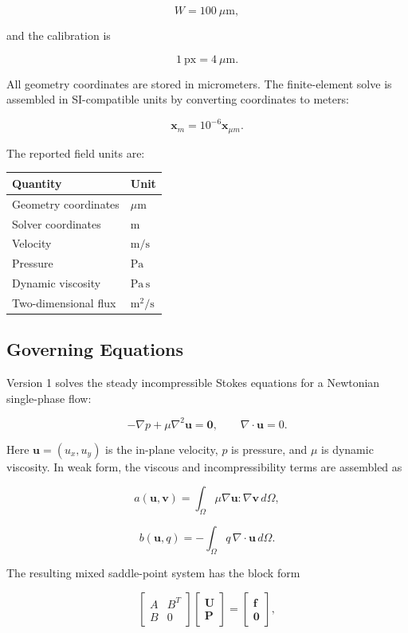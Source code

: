 \[
  W = 100~\mu\mathrm{m},
\]

and the calibration is

\[
  1~\mathrm{px} = 4~\mu\mathrm{m}.
\]

All geometry coordinates are stored in micrometers. The finite-element solve is
assembled in SI-compatible units by converting coordinates to meters:

\[
  \mathbf{x}_{m} = 10^{-6}\mathbf{x}_{\mu m}.
\]

The reported field units are:

\begin{center}
\begin{tabular}{@{}ll@{}}
\toprule
Quantity & Unit \\
\midrule
Geometry coordinates & \(\mu\mathrm{m}\) \\
Solver coordinates & \(\mathrm{m}\) \\
Velocity & \(\mathrm{m/s}\) \\
Pressure & \(\mathrm{Pa}\) \\
Dynamic viscosity & \(\mathrm{Pa\,s}\) \\
Two-dimensional flux & \(\mathrm{m^2/s}\) \\
\bottomrule
\end{tabular}
\end{center}

\subsection{Governing Equations}

Version 1 solves the steady incompressible Stokes equations for a Newtonian
single-phase flow:

\[
  -\nabla p + \mu \nabla^2 \mathbf{u} = \mathbf{0},
  \qquad
  \nabla \cdot \mathbf{u} = 0.
\]

Here \(\mathbf{u} = (u_x,u_y)\) is the in-plane velocity, \(p\) is pressure, and
\(\mu\) is dynamic viscosity. In weak form, the viscous and incompressibility
terms are assembled as

\[
  a(\mathbf{u},\mathbf{v})
  =
  \int_\Omega \mu \nabla \mathbf{u} : \nabla \mathbf{v}\,d\Omega,
\]

\[
  b(\mathbf{u},q)
  =
  -\int_\Omega q\,\nabla\cdot\mathbf{u}\,d\Omega.
\]

The resulting mixed saddle-point system has the block form

\[
  \begin{bmatrix}
  A & B^T \\
  B & 0
  \end{bmatrix}
  \begin{bmatrix}
  \mathbf{U} \\
  \mathbf{P}
  \end{bmatrix}
  =
  \begin{bmatrix}
  \mathbf{f} \\
  \mathbf{0}
  \end{bmatrix},
\]

